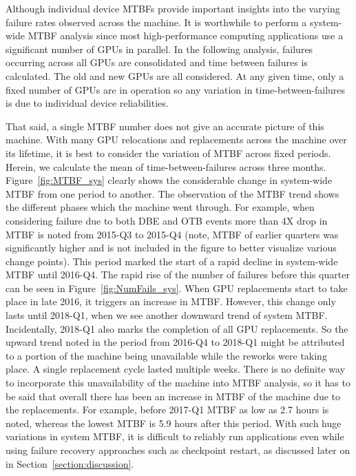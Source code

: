Although individual device MTBFs provide important insights into the varying failure rates
observed across the machine. It is worthwhile to perform a system-wide MTBF analysis since 
most high-performance computing applications use a significant number of GPUs in parallel. 
In the following analysis, failures occurring across all GPUs are consolidated and time between failures
is calculated. The old and new GPUs are all considered. At any given time, only a fixed number of GPUs
are in operation so any variation in time-between-failures is due to individual device reliabilities.

That said, a single MTBF number does not give an accurate picture of this machine.
With many GPU relocations and replacements across the machine over its lifetime, it is 
best to consider the variation of MTBF across fixed periods. Herein, we calculate 
the mean of time-between-failures across three months. Figure~\ref{fig:MTBF_sys}
clearly shows the considerable change in system-wide MTBF from one period to another. 
The observation of the MTBF trend shows the different phases which the machine went through. 
For example, when considering failure due to both DBE and OTB events more than 4X drop in MTBF is 
noted from 2015-Q3 to 2015-Q4 (note, MTBF of earlier quarters was significantly higher and is not 
included in the figure to better visualize various change points). This period marked the start of 
a rapid decline in system-wide MTBF until 2016-Q4. The rapid rise of the number of failures before this 
quarter can be seen in Figure~\ref{fig:NumFails_sys}. When GPU replacements start to take place in late 
2016, it triggers an increase in MTBF. However, this change only lasts until 2018-Q1, when we see another 
downward trend of system MTBF. Incidentally, 2018-Q1 also marks the completion of all GPU replacements. 
So the upward trend noted in the period from 2016-Q4 to 2018-Q1 might be attributed to a portion of the machine 
being unavailable while the reworks were taking place. A single replacement cycle lasted multiple weeks. 
There is no definite way to incorporate this unavailability of the machine into MTBF analysis, so it has to
be said that overall there has been an increase in MTBF of the machine due to the replacements. 
For example, before 2017-Q1 MTBF as low as 2.7 hours is noted, whereas the lowest MTBF is 5.9 hours after this 
period. With such huge variations in system MTBF, it is difficult to reliably run applications even while using 
failure recovery approaches such as checkpoint restart, as discussed later on in Section~\ref{section:discussion}. 

